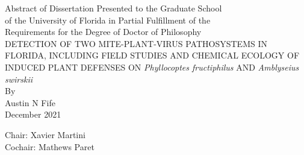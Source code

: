 \documentclass{ufdissertation}[overrideChapters] %
\begin{document}
 \realSingleSpace
  \tableofcontents %



  \listoftables  %



  \listoffigures %



\newpage                         %
    \label{abstract}
        \begin{center}\realSingleSpace
            Abstract of Dissertation Presented to the Graduate School \\
            of the University of Florida in Partial Fulfillment of the \\
            Requirements for the Degree of Doctor of Philosophy\\[\baselineskip]
            {DETECTION OF TWO MITE-PLANT-VIRUS PATHOSYSTEMS IN FLORIDA, INCLUDING FIELD STUDIES AND CHEMICAL ECOLOGY OF INDUCED PLANT DEFENSES ON \emph{Phyllocoptes fructiphilus} AND \emph{Amblyseius swirskii}}\\[\baselineskip] %
            By\\[\baselineskip]
            {Austin N Fife} \\[\baselineskip]
            {December} {2021}\\[\baselineskip]
        \end{center}
    \realSingleSpace\vspace*{-\baselineskip}
            \hfill \break
                \noindent Chair: {Xavier Martini} \\    %
                                \noindent Cochair: {Mathews Paret} \\%
\end{document}
